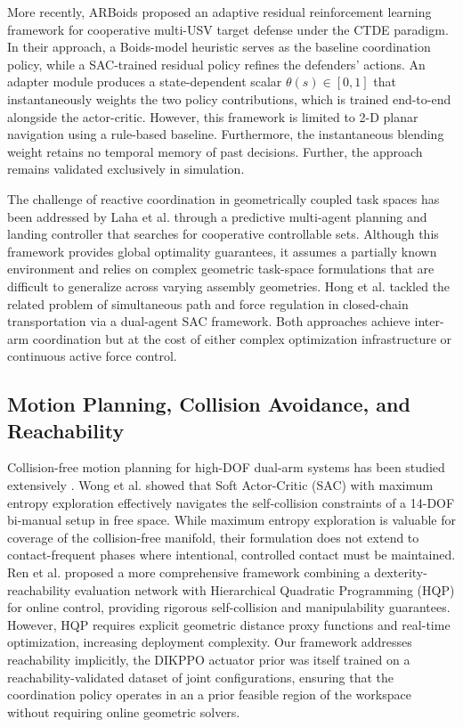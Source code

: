 \documentclass[lettersize,journal]{IEEEtran}
\begin{document}
More recently, ARBoids \cite{arboids} proposed an adaptive residual reinforcement learning framework for cooperative multi-USV target defense under the CTDE paradigm. In their approach, a Boids-model heuristic serves as the baseline coordination policy, while a SAC-trained residual policy refines the defenders' actions. An adapter module produces a state-dependent scalar $\theta(s) \in [0,1]$ that instantaneously weights the two policy contributions, which is trained end-to-end alongside the actor-critic. However, this framework is limited to 2-D planar navigation using a rule-based baseline. Furthermore, the instantaneous blending weight retains no temporal memory of past decisions. Further, the approach remains validated exclusively in simulation.

The challenge of reactive coordination in geometrically coupled task spaces has been addressed by Laha et al. \cite{related-45} through a predictive multi-agent planning and landing controller that searches for cooperative controllable sets. Although this framework provides global optimality guarantees, it assumes a partially known environment and relies on complex geometric task-space formulations that are difficult to generalize across varying assembly geometries. Hong et al. \cite{related-46} tackled the related problem of simultaneous path and force regulation in closed-chain transportation via a dual-agent SAC framework. Both approaches achieve inter-arm coordination but at the cost of either complex optimization infrastructure or continuous active force control.

\subsection{Motion Planning, Collision Avoidance, and Reachability}
Collision-free motion planning for high-DOF dual-arm systems has been studied extensively \cite{sksp}. Wong et al. \cite{related-47} showed that Soft Actor-Critic (SAC) with maximum entropy exploration effectively navigates the self-collision constraints of a 14-DOF bi-manual setup in free space. While maximum entropy exploration is valuable for coverage of the collision-free manifold, their formulation does not extend to contact-frequent phases where intentional, controlled contact must be maintained. Ren et al. \cite{related-48} proposed a more comprehensive framework combining a dexterity-reachability evaluation network with Hierarchical Quadratic Programming (HQP) for online control, providing rigorous self-collision and manipulability guarantees. However, HQP requires explicit geometric distance proxy functions and real-time optimization, increasing deployment complexity. Our framework addresses reachability implicitly, the DIKPPO actuator prior was itself trained on a reachability-validated dataset of joint configurations, ensuring that the coordination policy operates in an a prior feasible region of the workspace without requiring online geometric solvers.
\end{document}
